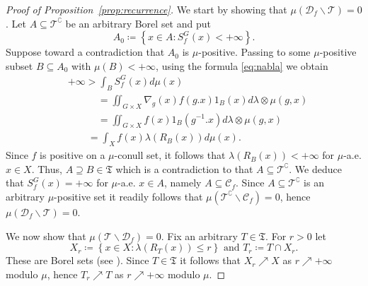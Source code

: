 \documentclass{amsart}
\numberwithin{equation}{subsection}
\begin{document}
\begin{proof}[Proof of Proposition~\ref{prop:recurrence}]
We start by showing that \(\mu\left(\mathcal{D}_{f}\backslash\mathcal{T}\right)=0\). Let \(A\subseteq\mathcal{T}^{\complement}\) be an arbitrary Borel set and put
\[A_{0}\coloneqq \left\{x\in A:S_{f}^{G}\left(x\right)<+\infty\right\}.\]
Suppose toward a contradiction that \(A_{0}\) is \(\mu\)-positive. Passing to some \(\mu\)-positive subset \(B\subseteq A_{0}\) with \(\mu(B)<+\infty\), using the formula \eqref{eq:nabla} we obtain
\begin{align*}
&+\infty>\int_{B}S_{f}^{G}\left(x\right)d\mu\left(x\right)\\
&\qquad\quad=\iint\nolimits_{G\times X}\nabla_{g}\left(x\right)f\left(g.x\right)1_{B}\left(x\right)d\lambda\otimes\mu\left(g,x\right)\\
&\qquad\quad=\iint\nolimits_{G\times X}f\left(x\right)1_{B}\left(g^{-1}.x\right)d\lambda\otimes\mu\left(g,x\right)\\
&\qquad=\int_{X}f\left(x\right)\lambda\left(R_{B}\left(x\right)\right)d\mu\left(x\right).
\end{align*}
Since \(f\) is positive on a \(\mu\)-conull set, it follows that \(\lambda\left(R_{B}\left(x\right)\right)<+\infty\) for \(\mu\)-a.e. \(x\in X\). Thus, \(A\supseteq B\in\mathfrak{T}\) which is a contradiction to that \(A\subseteq\mathcal{T}^{\complement}\). We deduce that \(S_{f}^{G}\left(x\right)=+\infty\) for \(\mu\)-a.e. \(x\in A\), namely \(A\subseteq\mathcal{C}_{f}\). Since \(A\subseteq\mathcal{T}^{\complement}\) is an arbitrary \(\mu\)-positive set it readily follows that \(\mu\left(\mathcal{T}^{\complement}\backslash\mathcal{C}_{f}\right)=0\), hence \(\mu\left(\mathcal{D}_{f}\backslash\mathcal{T}\right)=0\).

We now show that \(\mu\left(\mathcal{T}\backslash\mathcal{D}_{f}\right)=0\). Fix an arbitrary \(T\in\mathfrak{T}\). For \(r>0\) let
\[X_{r}\coloneqq \left\{x\in X:\lambda\left(R_{T}\left(x\right)\right)\leq r\right\}\text{ and }T_{r}\coloneqq T\cap X_{r}.\]
These are Borel sets (see \cite[Theorem (17.25)]{kechris2012descriptive}). Since \(T\in\mathfrak{T}\) it follows that \(X_{r}\nearrow X\) as \(r\nearrow +\infty\) modulo \(\mu\), hence \(T_{r}\nearrow T\) as \(r\nearrow +\infty\) modulo \(\mu\).


\end{proof}
\end{document}
